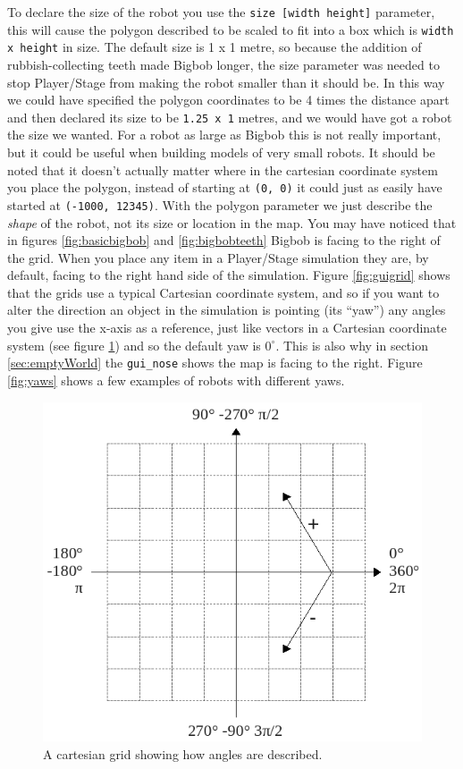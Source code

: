 \documentclass[a4paper]{report}
\newcommand{\plst}{Player/Stage\xspace}
\begin{document}
To declare the size of the robot you use the \verb|size [width height]| parameter, this will cause the polygon described to be scaled to fit into a box which is \verb|width x height| in size. The default size is 1 x 1 metre, so because the addition of rubbish-collecting teeth made Bigbob longer, the size parameter was needed to stop \plst from making the robot smaller than it should be. In this way we could have specified the polygon coordinates to be 4 times the distance apart and then declared its size to be \verb|1.25 x 1| metres, and we would have got a robot the size we wanted. For a robot as large as Bigbob this is not really important, but it could be useful when building models of very small robots. 
It should be noted that it doesn't actually matter where in the cartesian coordinate system you place the polygon, instead of starting at \verb|(0, 0)| it could just as easily have started at \verb|(-1000, 12345)|. With the polygon parameter we just describe the \emph{shape} of the robot, not its size or location in the map. \newline
You may have noticed that in figures \ref{fig:basicbigbob} and \ref{fig:bigbobteeth} Bigbob is facing to the right of the grid. When you place any item in a \plst simulation they are, by default, facing to the right hand side of the simulation. Figure \ref{fig:guigrid} shows that the grids use a typical Cartesian coordinate system, and so if you want to alter the direction an object in the simulation is pointing (its ``yaw'') any angles you give use the x-axis as a reference, just like vectors in a Cartesian coordinate system (see figure \ref{fig:emptycartgrid}) and so the default yaw is $0^{\circ}$. This is also why in section \ref{sec:emptyWorld} the \verb|gui_nose| shows the map is facing to the right. Figure \ref{fig:yaws} shows a few examples of robots with different yaws.

\begin{figure}
	\centering
	\includegraphics[width=0.5\linewidth]{./pics/robot_building/cartesian_grid_wpolars.png} 
	\caption{A cartesian grid showing how angles are described.}
	\label{fig:emptycartgrid}
\end{figure}
\end{document}
